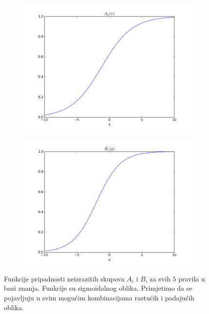 \documentclass[paper=a4, fontsize=11pt]{scrartcl} %
\numberwithin{equation}{section} %
\numberwithin{figure}{section} %
\numberwithin{table}{section} %
\begin{document}
\begin{figure}[h]
\begin{subfigure}[b]{0.45\textwidth}
\includegraphics[width=\textwidth]{A_B/figure_9.png}
\end{subfigure}
\begin{subfigure}[b]{0.45\textwidth}
\includegraphics[width=\textwidth]{A_B/figure_10.png}
\end{subfigure}
\caption{Funkcije pripadnosti neizrazitih skupova $A_i$ i $B_i$ za svih $5$ pravila u bazi znanja. Funkcije su sigmoidalnog oblika. Primjetimo da se pojavljuju u svim mogućim kombinacijama rastućih i padajućih oblika.}
\end{figure}
\end{document}
